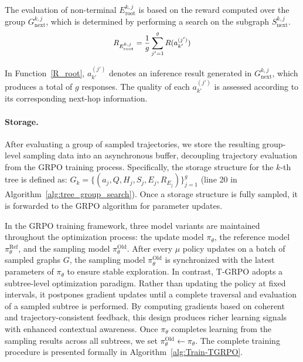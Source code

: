 \documentclass[letterpaper]{article} %
\begin{document}
The evaluation of non-terminal ${E_\text{root}^{k, j}}$ is based on the reward computed over the group $G^{k,j}_\text{next}$, which is determined by performing a search on the subgraph $S^{k,j}_\text{next}$. %
\begin{equation}  \small
	\begin{aligned}  
    R_{E_\text{root}^{k,j}} = \frac{1}{g} \sum_{j'=1}^{g}{R(a_{k'}^{(j')})}
	\end{aligned} 
    \label{R_root}
\end{equation} 

\noindent In Function~\eqref{R_root}, $a_{k'}^{(j')}$ denotes an inference result generated in $G^{k,j}_{\text{next}}$, which produces a total of $g$ responses. The quality of each $a_{k'}^{(j')}$ is assessed according to its corresponding next-hop information.


\paragraph{Storage.}
After evaluating a group of sampled trajectories, we store the resulting group-level sampling data into an asynchronous buffer, decoupling trajectory evaluation from the GRPO training process.
Specifically, the storage structure for the $k$-th tree is defined as:
$G_k = \{ (a_j, Q, H_j, S_j, E_j, R_{E_j}) \}_{j=1}^{g}$ (line 20 in Algorithm~\ref{alg:tree_group_search}). Once a storage structure is fully sampled, it is forwarded to the GRPO algorithm for parameter updates.


 In the GRPO training framework, three model variants are maintained throughout the optimization process: the update model $\pi_\theta$, the reference model $\pi_{\theta}^{\mathrm{Ref}}$, and the sampling model $\pi_{\theta}^{\mathrm{Old}}$. After every $\mu$ policy updates on a batch of sampled graphs $G$, the sampling model $\pi_{\theta}^{\mathrm{Old}}$ is synchronized with the latest parameters of $\pi_\theta$ to ensure stable exploration.
In contrast, T-GRPO adopts a subtree-level optimization paradigm. Rather than updating the policy at fixed intervals, it postpones gradient updates until a complete traversal and evaluation of a sampled subtree is performed. By computing gradients based on coherent and trajectory-consistent feedback, this design produces richer learning signals with enhanced contextual awareness. Once $\pi_\theta$ completes learning from the sampling results across all subtrees, we set $\pi_\theta^{\text{Old}} \gets \pi_\theta$. The complete training procedure is presented formally in Algorithm~\ref{alg:Train-TGRPO}.
\end{document}
